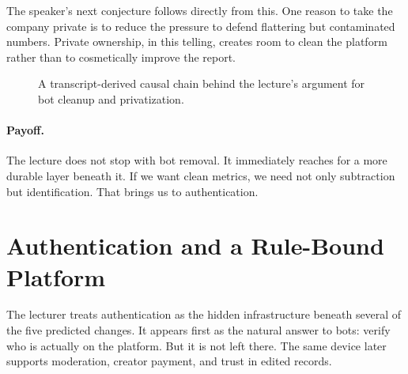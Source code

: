The speaker's next conjecture follows directly from this. One reason to take the company private is to reduce the pressure to defend flattering but contaminated numbers. Private ownership, in this telling, creates room to clean the platform rather than to cosmetically improve the report.

\begin{figure}[h]
\centering
{}
\caption{A transcript-derived causal chain behind the lecture's argument for bot cleanup and privatization.}
\end{figure}

\paragraph{Payoff.}
The lecture does not stop with bot removal. It immediately reaches for a more durable layer beneath it. If we want clean metrics, we need not only subtraction but identification. That brings us to authentication.

\section{Authentication and a Rule-Bound Platform}

The lecturer treats authentication as the hidden infrastructure beneath several of the five predicted changes. It appears first as the natural answer to bots: verify who is actually on the platform. But it is not left there. The same device later supports moderation, creator payment, and trust in edited records.

